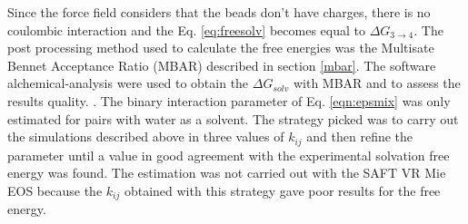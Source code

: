 Since the force field considers that the beads don't have charges, there is no coulombic interaction and the Eq. \eqref{eq:freesolv} becomes equal to $\Delta G_{3 \rightarrow 4} $. The post processing method used to calculate the free energies was the Multisate Bennet Acceptance Ratio (MBAR) described in section \ref{mbar}. The software alchemical-analysis \cite{klimovich} were used to obtain the $\Delta G_{solv}$ with MBAR and to assess the results quality. . The binary interaction  parameter of Eq. \eqref{eqn:epsmix} was only estimated for pairs with water as a solvent. The strategy picked was to carry out the simulations described above in three values of $k_{ij}$ and then refine the parameter until a value in good agreement with the experimental solvation free energy was found. The estimation was not carried out with the SAFT VR Mie EOS because the $k_{ij}$ obtained  with this strategy gave poor results for the free energy.



